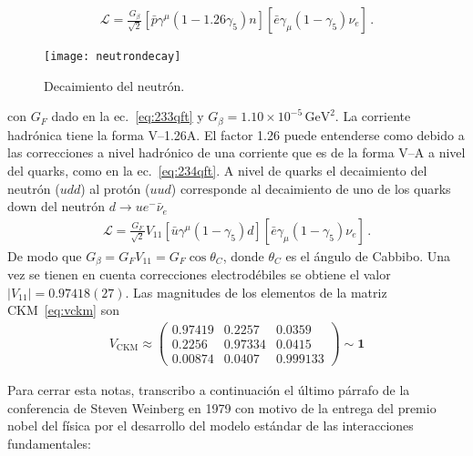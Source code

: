 \begin{frame}
\begin{align}
    \mathcal{L}=\frac{G_\beta}{\sqrt{2}}\left[\bar{p}\gamma^\mu(1-1.26\gamma_5)n\right]\left[\bar{e}\gamma_\mu(1-\gamma_5)\nu_e\right]\,.
\end{align}
\begin{figure}
  \centering
  \texttt{[image: neutrondecay]}
  \caption{Decaimiento del neutrón.}
  \label{fig:neutrondecay}
\end{figure}
con $G_F$ dado en la ec.~\eqref{eq:233qft} y $G_\beta=1.10\times 10^{-5}\,\text{GeV}^2$. La corriente hadrónica tiene la forma V--1.26A. El factor 1.26  puede entenderse como debido a las correcciones a nivel hadrónico de una corriente que es de la forma V--A a nivel del quarks, como en la ec.~\eqref{eq:234qft}. A nivel de quarks el decaimiento del neutrón ($udd$) al protón ($uud$) corresponde al decaimiento de uno de los quarks down del neutrón $d\to u e^- \bar{\nu}_e$
\begin{align}
    \mathcal{L}=\frac{G_F}{\sqrt{2}}V_{11}\left[\bar{u}\gamma^\mu(1-\gamma_5)d\right]\left[\bar{e}\gamma_\mu(1-\gamma_5)\nu_e\right]\,.
\end{align}
De modo que $G_\beta=G_F V_{11}=G_F\cos\theta_C$, donde $\theta_C$ es el ángulo de Cabbibo. Una vez se tienen en cuenta correcciones electrodébiles se obtiene el valor $|V_{11}|=0.97418(27)$\cite{PDG}. Las magnitudes de los elementos de la matriz CKM~\eqref{eq:vckm} son~\cite{PDG}
\begin{align}
  V_{\text{CKM}}\approx\begin{pmatrix}
    0.97419&0.2257&0.0359\\
    0.2256&0.97334&0.0415\\
    0.00874&0.0407&0.999133
  \end{pmatrix}\sim \mathbf{1}
\end{align}
\end{frame}

Para cerrar esta notas, transcribo a continuación el último párrafo de la conferencia de Steven Weinberg en 1979 con motivo de la entrega del premio nobel del física por el desarrollo del modelo estándar de las interacciones fundamentales:

